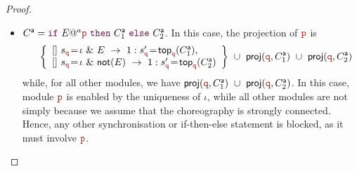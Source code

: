\begin{proof}
\begin{itemize}
    For the converse direction, we must show that the above is the
    only enabled reduction in the PRISM semantics. As for modules
    $\nr$, $\nr_1$, \ldots, $\nr_n$, since the state $S_+$ yields
    $\iota$, $\iota_1$, \dots, $\iota_n$, no other reduction is
    possible. Other modules, projected as
    $\bigcup_{j\in J} \proj(\nrr, \anno C_j)$, are locally enabled by
    state $S_+$ to perform their next action. If, by contradiction, we
    can apply rule $\mathsf{(Transition)}$, derived by an application
    of rule $\mathsf{(P_1)}$ on some label $b$ (which must be
    different from $a$), on a different set of modules $\{\nrrr_k\}$,
    then we could show that there is no causal dependency between
    modules $\nr$, $\nr_1$, \ldots, $\nr_n$ and modules $\{\nrrr_k\}$,
    violating indeed the fact that the choreography is strongly
    connected. This reasoning is standard for projection theorems like
    the one we are proving~\cite{CHY12}.


  \item $\anno C=\ifTEl {E}a{\nr}{\anno C_1}{\anno C_2}$.
      In this case, the projection of $\nr$ is
      \begin{equation*}
      \quad\left\{ 
      \begin{array}{lll}
        \commandBase {} {s_{\nrr}\!=\! \iota\ \&\ E}{\ 1: s'_{\nrr}\!=\!
        \mathsf{top}_{\nrr}(\anno C_1)},\\ 
        \commandBase {} {s_{\nrr}\!=\! \iota\ \&\ \mathsf{not}(E)}
        {\ 1: s'_{\nrr}\!=\! \mathsf{top}_{\nrr}(\anno C_2)}
      \end{array}
      \right\}
      \ \cup\ \proj (\nrr, \anno C_1)
      \ \cup\
      \proj (\nrr, \anno C_2)
      \end{equation*}
      while, for all other modules, we have
      $ \proj (\nrr, \anno C_1) \ \cup\ \proj (\nrr, \anno C_2) $.  In
      this case, module $\nr$ is enabled by the uniqueness of $\iota$,
      while all other modules are not simply because we assume that
      the choreography is strongly connected. Hence, any other
      synchronisation or if-then-else statement is blocked, as it must
      involve $\nr$.
      


\end{itemize}
\end{proof}
